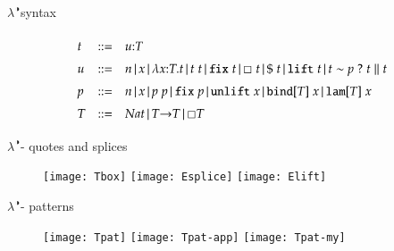 \documentclass{beamer}
\def\t{t}
\def\u{u}
\def\p{p}
\newcommand{\calculus}{$\lambda^{\RIGHTcircle}$}
\newcommand{\quoted}[1]{\Box\;#1}
\newcommand{\lift}[1]{\texttt{lift}\;#1}
\newcommand{\qtype}[1]{\Box#1}
\newcommand{\splice}[1]{\$\;#1}
\newcommand{\fix}[1]{\texttt{fix}\;#1}
\newcommand{\app}[2]{#1\;#2}
\newcommand{\tpd}[2]{{#1}{:}{#2}}
\newcommand{\patnat}[1]{#1}
\newcommand{\patapp}[2]{#1\;#2}
\newcommand{\patref}[1]{#1}
\newcommand{\patunlift}[1]{\texttt{unlift}\;#1}
\newcommand{\patbind}[2]{\texttt{bind}[#2]\;#1}
\newcommand{\patlam}[2]{\texttt{lam}[#2]\;#1}
\newcommand{\patfix}[1]{\texttt{fix}\;#1}
\newcommand{\patmat}[4]{\patmatSP{#1}{#2}\patmatThen{#3}#4}
\newcommand{\patmatSP}[2]{#1 \sim #2\;?}
\newcommand{\patmatThen}[1]{\;#1\; \| \;}
\newcommand{\lam}[3]{\lambda#1{:}#2.#3}
\begin{document}
\newcommand{\sep}{\,|\,}
\begin{frame}{\calculus syntax}

\[
\def\arraystretch{1.5}
\begin{array}{lllr}

\t & ::= & \tpd{\u}{T} \\
\u & ::= & n \sep x \sep \lam{x}{T}{\t} \sep \app{\t}{\t} \sep \fix{\t} \sep \quoted{\t} \sep \splice{\t} \sep \lift{\t} \sep \patmat{\t}{\p}{\t}{\t} \\


\p & ::= & \patnat{n} \sep \patref{x} \sep \patapp{\p}{\p} \sep \patfix{\p} \sep \patunlift{x} \sep \patbind{x}{T} \sep \patlam{x}{T} \\

T & ::= & Nat \sep T{\to}T \sep \qtype{T} \\

%
\end{array}
\]

\let\thefootnote\relax{}

\end{frame}

\begin{frame}{\calculus - quotes and splices}
\begin{figure}
  \texttt{[image: Tbox]}
  \texttt{[image: Esplice]}
    \texttt{[image: Elift]}
\end{figure}
\end{frame}

\begin{frame}{\calculus - patterns}
\begin{figure}
  \texttt{[image: Tpat]}
  \texttt{[image: Tpat-app]}
  \texttt{[image: Tpat-my]}
\end{figure}
\end{frame}
\end{document}
